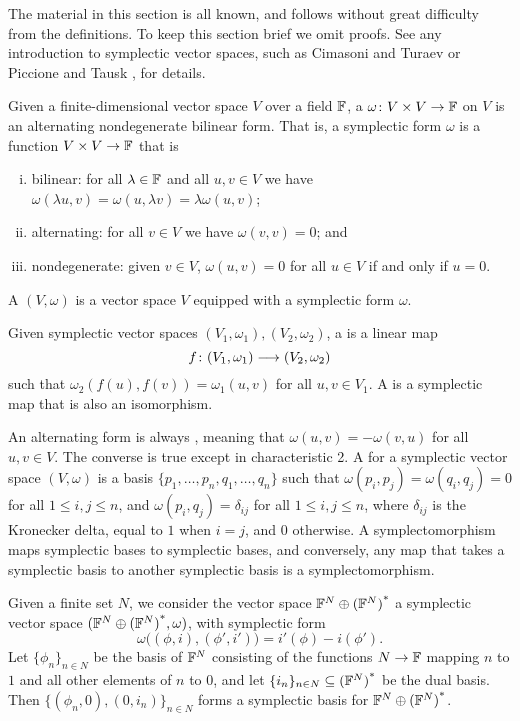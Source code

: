The material in this section is all known, and follows without great difficulty
from the definitions. To keep this section brief we omit proofs. See any
introduction to symplectic vector spaces, such as Cimasoni and Turaev \cite{CT} or
Piccione and Tausk \cite{PT}, for details.

\begin{definition}
  Given a finite-dimensional vector space $V$ over a field ${\mathbb F}$, a 
  $\omega{\colon} V \times V \to {\mathbb F}$ on $V$ is an alternating nondegenerate bilinear
  form.  That is, a symplectic form $\omega$ is a function $V \times V \to {\mathbb F}$
  that is
  \begin{enumerate}[(i)]
    \item bilinear: for all $\lambda \in {\mathbb F}$ and all $u,v \in V$ we have
      $\omega(\lambda u,v) = \omega(u,\lambda v) =  \lambda \omega(u,v)$;
    \item alternating: for all $v \in V$ we have $\omega(v,v) = 0$; and
    \item nondegenerate: given $v \in V$, $\omega(u,v) = 0$ for all $u \in V$ if
      and only if $u = 0$.
  \end{enumerate} 
  A  $(V,\omega)$ is a vector space $V$ equipped
  with a symplectic form $\omega$. 

  Given symplectic vector spaces $(V_1,\omega_1), (V_2, \omega_2)$, a
   is a linear map 
  \[
    f{\colon} (V_1,\omega_1) \longrightarrow (V_2, \omega_2)
  \]
  such that $\omega_2(f(u),f(v)) = \omega_1(u,v)$ for all $u,v \in V_1$. A
   is a symplectic map that is also an isomorphism. 
\end{definition}

An alternating form is always , meaning that $\omega(u,v) = 
-\omega(v,u)$ for all $u,v \in V$.  The converse is true except in characteristic 2.
A  for a symplectic vector space $(V,\omega)$ is a
basis $\{p_1,\dots,p_n,q_1,\dots,q_n\}$ such that $\omega(p_i,p_j) =
\omega(q_i,q_j) = 0$ for all $1 \le i,j \le n$, and $\omega(p_i,q_j) =
\delta_{ij}$ for all $1 \le i,j\le n$, where $\delta_{ij}$ is the Kronecker delta,
equal to $1$ when $i =j$, and $0$ otherwise. A symplectomorphism maps symplectic
bases to symplectic bases, and conversely, any map that takes a symplectic basis
to another symplectic basis is a symplectomorphism.

\begin{example}
  \label{ex:symplectic_space_generated_by_set}
  Given a finite set $N$, we consider the vector space ${{\mathbb F}^{N} \oplus {({\mathbb F}^{N})}^\ast}$ a symplectic
  vector space $({{\mathbb F}^{N} \oplus {({\mathbb F}^{N})}^\ast},\omega)$, with symplectic form 
  \[
    \omega\big((\phi,i),(\phi',i')\big) = i'(\phi)-i(\phi').  
  \] 
  Let $\{\phi_n\}_{n \in N}$ be the basis of ${\mathbb F}^N$ consisting of the functions
  $N \to {\mathbb F}$ mapping $n$ to $1$ and all other elements of $n$ to $0$, and let
  $\{i_n\}_{n \in N} \subseteq {({\mathbb F}^N)}^\ast$ be the dual basis. Then
  $\{(\phi_n,0),(0,i_n)\}_{n\in N}$ forms a symplectic basis for ${{\mathbb F}^{N} \oplus {({\mathbb F}^{N})}^\ast}$.  
\end{example}


